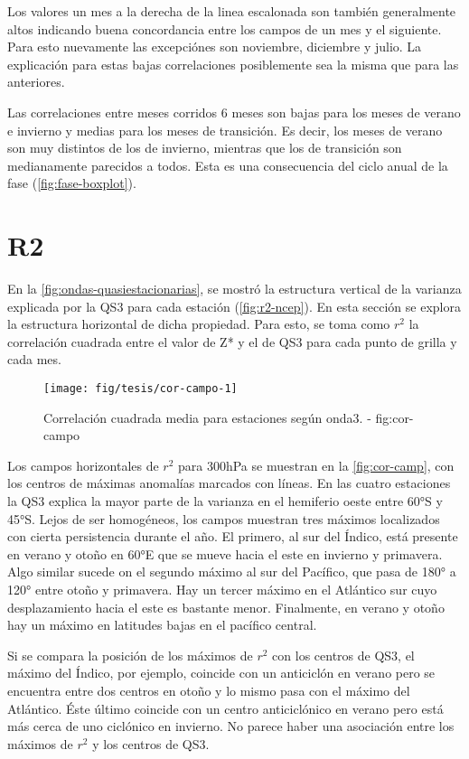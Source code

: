 \documentclass[spanish,a4paper]{book}
\begin{document}
Los valores un mes a la derecha de la linea escalonada son también
generalmente altos indicando buena concordancia entre los campos de un
mes y el siguiente. Para esto nuevamente las excepciónes son noviembre,
diciembre y julio. La explicación para estas bajas correlaciones
posiblemente sea la misma que para las anteriores.

Las correlaciones entre meses corridos 6 meses son bajas para los meses
de verano e invierno y medias para los meses de transición. Es decir,
los meses de verano son muy distintos de los de invierno, mientras que
los de transición son medianamente parecidos a todos. Esta es una
consecuencia del ciclo anual de la fase (\autoref{fig:fase-boxplot}).

\section{R2}\label{r2}

En la \autoref{fig:ondas-quasiestacionarias}, se mostró la estructura
vertical de la varianza explicada por la QS3 para cada estación
(\autoref{fig:r2-ncep}). En esta sección se explora la estructura
horizontal de dicha propiedad. Para esto, se toma como \(r^2\) la
correlación cuadrada entre el valor de Z* y el de QS3 para cada punto de
grilla y cada mes.

\begin{figure}
\texttt{[image: fig/tesis/cor-campo-1]} \caption{Correlación cuadrada media para estaciones según onda3. - fig:cor-campo}\label{fig:cor-campo}
\end{figure}

Los campos horizontales de \(r^2\) para 300hPa se muestran en la
\autoref{fig:cor-camp}, con los centros de máximas anomalías marcados
con líneas. En las cuatro estaciones la QS3 explica la mayor parte de la
varianza en el hemiferio oeste entre 60°S y 45°S. Lejos de ser
homogéneos, los campos muestran tres máximos localizados con cierta
persistencia durante el año. El primero, al sur del Índico, está
presente en verano y otoño en 60°E que se mueve hacia el este en
invierno y primavera. Algo similar sucede on el segundo máximo al sur
del Pacífico, que pasa de 180° a 120° entre otoño y primavera. Hay un
tercer máximo en el Atlántico sur cuyo desplazamiento hacia el este es
bastante menor. Finalmente, en verano y otoño hay un máximo en latitudes
bajas en el pacífico central.

Si se compara la posición de los máximos de \(r^2\) con los centros de
QS3, el máximo del Índico, por ejemplo, coincide con un anticiclón en
verano pero se encuentra entre dos centros en otoño y lo mismo pasa con
el máximo del Atlántico. Éste último coincide con un centro
anticiclónico en verano pero está más cerca de uno ciclónico en
invierno. No parece haber una asociación entre los máximos de \(r^2\) y
los centros de QS3.
\end{document}
